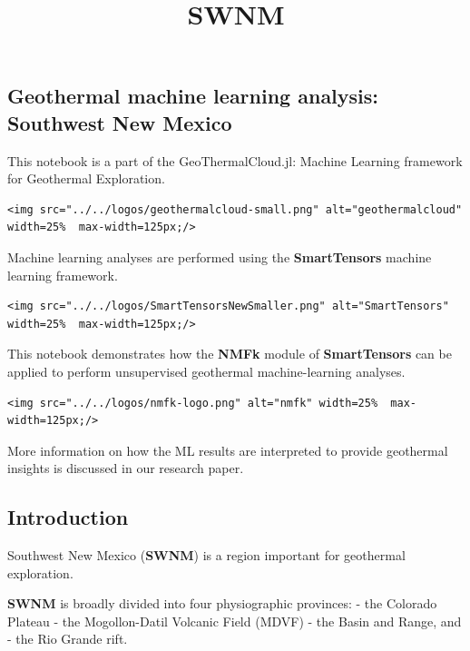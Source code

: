 \documentclass[11pt]{article}
\title{SWNM}
\begin{document}
    
    \maketitle
    
    

    
    \hypertarget{geothermal-machine-learning-analysis-southwest-new-mexico}{%
\subsection{Geothermal machine learning analysis: Southwest New
Mexico}\label{geothermal-machine-learning-analysis-southwest-new-mexico}}

This notebook is a part of the GeoThermalCloud.jl: Machine Learning
framework for Geothermal Exploration.

\begin{verbatim}
<img src="../../logos/geothermalcloud-small.png" alt="geothermalcloud" width=25%  max-width=125px;/>
\end{verbatim}

Machine learning analyses are performed using the \textbf{SmartTensors}
machine learning framework.

\begin{verbatim}
<img src="../../logos/SmartTensorsNewSmaller.png" alt="SmartTensors" width=25%  max-width=125px;/>
\end{verbatim}

This notebook demonstrates how the \textbf{NMFk} module of
\textbf{SmartTensors} can be applied to perform unsupervised geothermal
machine-learning analyses.

\begin{verbatim}
<img src="../../logos/nmfk-logo.png" alt="nmfk" width=25%  max-width=125px;/>
\end{verbatim}

More information on how the ML results are interpreted to provide
geothermal insights is discussed in our research paper.

    \hypertarget{introduction}{%
\subsection{Introduction}\label{introduction}}

Southwest New Mexico (\textbf{SWNM}) is a region important for
geothermal exploration.

\textbf{SWNM} is broadly divided into four physiographic provinces: -
the Colorado Plateau - the Mogollon-Datil Volcanic Field (MDVF) - the
Basin and Range, and - the Rio Grande rift.
\end{document}
